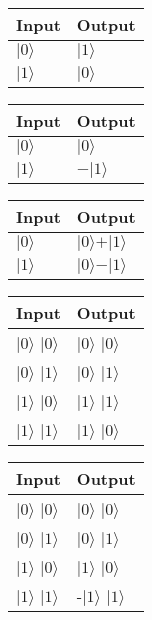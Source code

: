 \documentclass[DIV=12, english, fontsize=12pt, parskip=half]{scrartcl}
\begin{document}
		
	\centering 
	
	\begin{tabular}{|l|l|}
		\hline
		Input & Output \\ \hline
		$\vert 0 \rangle$ & $\vert 1 \rangle$ \\ \hline
		$\vert 1 \rangle$ & $\vert 0 \rangle$ \\ \hline
	\end{tabular}


	\begin{tabular}{|l|l|}
		\hline
		Input & Output \\ \hline
		$\vert 0 \rangle$ & $\vert 0 \rangle$ \\ \hline
		$\vert 1 \rangle$ & $-\vert 1 \rangle$ \\ \hline
	\end{tabular}
 
 
	\begin{tabular}{|l|l|}
		\hline
		Input & Output \\ \hline
		$\vert 0 \rangle$ & $\vert 0 \rangle + \vert 1 \rangle$ \\ \hline
		$\vert 1 \rangle$ & $\vert 0 \rangle - \vert 1 \rangle$ \\ \hline
	\end{tabular}


	\begin{tabular}{|l|l|}
		\hline
		Input & Output \\ \hline
		$\vert 0 \rangle$ $\vert 0 \rangle$ & $\vert 0 \rangle$ $\vert 0 \rangle$ \\ \hline
		$\vert 0 \rangle$ $\vert 1 \rangle$ & $\vert 0 \rangle$ $\vert 1 \rangle$ \\ \hline
		$\vert 1 \rangle$ $\vert 0 \rangle$ & $\vert 1 \rangle$ $\vert 1 \rangle$ \\ \hline
		$\vert 1 \rangle$ $\vert 1 \rangle$ & $\vert 1 \rangle$ $\vert 0 \rangle$ \\ \hline
	\end{tabular}


	\begin{tabular}{|l|l|}
		\hline
		Input & Output \\ \hline
		$\vert 0 \rangle$ $\vert 0 \rangle$ & $\vert 0 \rangle$ $\vert 0 \rangle$ \\ \hline
		$\vert 0 \rangle$ $\vert 1 \rangle$ & $\vert 0 \rangle$ $\vert 1 \rangle$ \\ \hline
		$\vert 1 \rangle$ $\vert 0 \rangle$ & $\vert 1 \rangle$ $\vert 0 \rangle$ \\ \hline
		$\vert 1 \rangle$ $\vert 1 \rangle$ & -$\vert 1 \rangle$ $\vert 1 \rangle$ \\ \hline
	\end{tabular}

	
	
\end{document}
